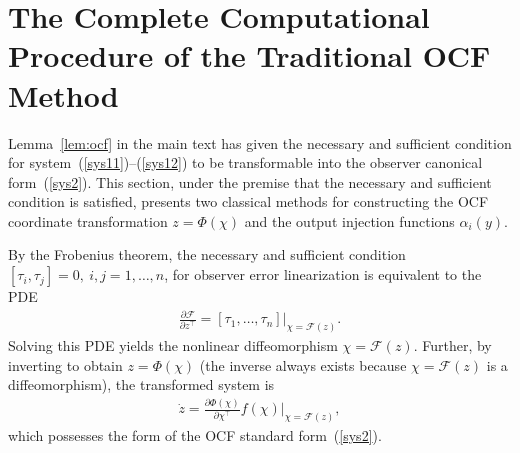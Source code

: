 \documentclass[11pt]{article}
\begin{document}
\section{The Complete Computational Procedure of the Traditional OCF Method}\label{app1}

Lemma~\ref{lem:ocf} in the main text has given the necessary and sufficient condition for system~(\ref{sys11})--(\ref{sys12}) to be transformable into the observer canonical form~(\ref{sys2}). This section, under the premise that the necessary and sufficient condition is satisfied, presents two classical methods for constructing the OCF coordinate transformation $z=\Phi(\chi)$ and the output injection functions $\alpha_i(y)$.


By the Frobenius theorem, the necessary and sufficient condition $[\tau_i,\tau_j]=0,~i,j=1,\ldots,n$, for observer error linearization is equivalent to the PDE
\begin{align}
	\frac{\partial \mathcal{F}}{\partial z^\top} = [\tau_1, \ldots, \tau_n]\vert_{\chi=\mathcal{F}(z)}.
\end{align}
Solving this PDE yields the nonlinear diffeomorphism $\chi=\mathcal{F}(z)$. Further, by inverting to obtain $z=\Phi(\chi)$ (the inverse always exists because $\chi=\mathcal{F}(z)$ is a diffeomorphism), the transformed system is
\begin{align}
	\dot{z}=\frac{\partial \Phi(\chi)}{\partial \chi^\top}f(\chi)\big|_{\chi=\mathcal{F}(z)},
\end{align}
which possesses the form of the OCF standard form~(\ref{sys2}).
\end{document}
